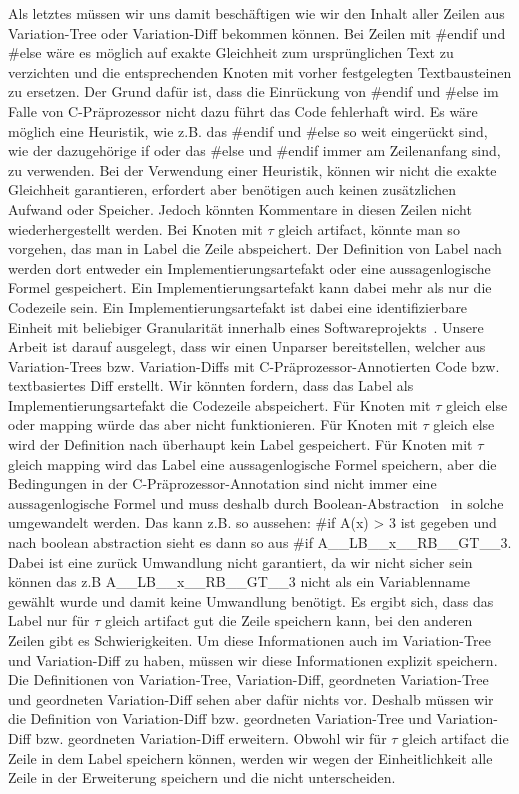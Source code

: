 Als letztes müssen wir uns damit beschäftigen wie wir den Inhalt aller Zeilen aus Variation-Tree oder Variation-Diff bekommen können. Bei Zeilen mit \#endif und \#else  wäre es möglich auf exakte Gleichheit zum ursprünglichen Text zu verzichten und die entsprechenden Knoten mit vorher festgelegten Textbausteinen zu ersetzen. Der Grund dafür ist, dass die Einrückung von \#endif und \#else im Falle von C-Präprozessor nicht dazu führt das Code fehlerhaft wird. Es wäre möglich eine Heuristik, wie z.B. das \#endif  und \#else so weit eingerückt sind, wie der dazugehörige if oder das \#else und \#endif immer am Zeilenanfang sind, zu verwenden. Bei der Verwendung einer Heuristik, können wir nicht die exakte Gleichheit garantieren, erfordert aber benötigen auch keinen zusätzlichen Aufwand oder Speicher. Jedoch könnten Kommentare in diesen Zeilen nicht wiederhergestellt werden. Bei Knoten mit $\tau$ gleich artifact, könnte man so vorgehen, das man in Label die Zeile abspeichert. Der Definition von Label nach werden dort entweder ein Implementierungsartefakt oder eine aussagenlogische Formel gespeichert. Ein Implementierungsartefakt kann dabei mehr als nur die Codezeile sein. Ein Implementierungsartefakt ist dabei  eine identifizierbare Einheit mit beliebiger Granularität innerhalb eines Softwareprojekts~\cite{BTS+:ESECFSE22}. Unsere Arbeit ist darauf ausgelegt, dass wir einen Unparser bereitstellen, welcher aus Variation-Trees bzw. Variation-Diffs mit C-Präprozessor-Annotierten Code bzw. textbasiertes Diff erstellt. Wir könnten fordern, dass das Label als Implementierungsartefakt die Codezeile abspeichert. Für Knoten mit $\tau$ gleich else oder mapping würde das aber nicht funktionieren. Für Knoten mit $\tau$ gleich else wird der Definition nach überhaupt kein Label gespeichert. Für Knoten mit $\tau$ gleich mapping wird das Label eine aussagenlogische Formel speichern, aber die Bedingungen in der C-Präprozessor-Annotation sind nicht immer eine aussagenlogische Formel und muss deshalb durch Boolean-Abstraction~\cite{BTS+:ESECFSE22} in solche umgewandelt werden. Das kann z.B. so aussehen: \#if A(x) > 3 ist gegeben und nach boolean abstraction sieht es dann so aus \#if A\_\_LB\_\_x\_\_RB\_\_GT\_\_3. Dabei ist eine zurück Umwandlung nicht garantiert, da wir nicht sicher sein können das z.B  A\_\_LB\_\_x\_\_RB\_\_GT\_\_3 nicht als ein Variablenname gewählt wurde und damit keine Umwandlung benötigt. Es ergibt sich, dass das Label nur für $\tau$ gleich artifact gut die Zeile speichern kann, bei den anderen Zeilen gibt es Schwierigkeiten. Um diese Informationen auch im Variation-Tree und Variation-Diff zu haben, müssen wir diese Informationen explizit speichern. Die Definitionen von Variation-Tree, Variation-Diff, geordneten Variation-Tree und geordneten Variation-Diff sehen aber dafür nichts vor. Deshalb müssen wir die Definition von Variation-Diff bzw. geordneten Variation-Tree und Variation-Diff bzw. geordneten Variation-Diff erweitern. Obwohl wir für $\tau$ gleich artifact die Zeile in dem Label speichern können, werden wir wegen der Einheitlichkeit alle Zeile in der Erweiterung speichern und die nicht unterscheiden.
